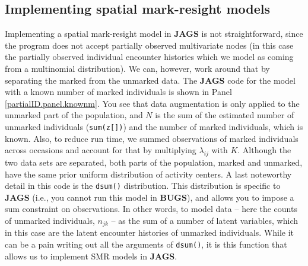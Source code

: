 \subsection{Implementing spatial mark-resight models}
Implementing a spatial mark-resight model in {\bf JAGS} is not
straightforward,
since the program does not accept partially observed
multivariate nodes (in this case the partially observed individual
encounter histories which we model as coming from a multinomial
distribution).
We can, however, work around that by separating the
marked from the unmarked data. The {\bf JAGS} code for the model with
a known number of marked individuals is shown in Panel
\ref{partialID.panel.knownm}. You see that data augmentation is only
applied to the unmarked part of the population, and $N$ is the sum of
the estimated number of unmarked individuals ({\tt sum(z[])}) and the
number of marked individuals, which is known. Also, to reduce run
time, we summed observations of marked individuals across occasions
and account for that by multiplying $\lambda_{ij}$ with $K$. Although
the two data sets are separated, both parts of the population, marked
and unmarked, have the same prior uniform distribution of activity
centers.  A last noteworthy detail in this code is the {\tt dsum()}
distribution.  This distribution is specific to {\bf JAGS} (i.e., you
cannot run this model in {\bf BUGS}), and allows you to
impose a sum constraint on observations.
In other words, to  model data --
here the counts of unmarked individuals, $n_{jk}$ -- as the sum of a
number of latent variables, which in this case are the latent
encounter histories of unmarked individuals. While it can be a pain
writing out all the arguments of {\tt dsum()}, it is this function
that allows us to implement SMR models in {\bf JAGS}.


